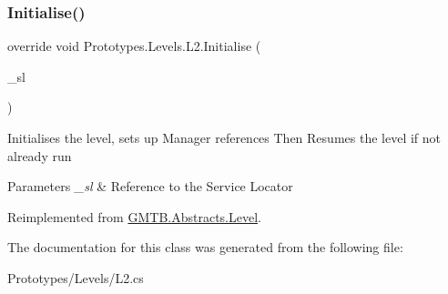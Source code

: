 \subsubsection{\texorpdfstring{Initialise()}{Initialise()}}
{\footnotesize\ttfamily override void Prototypes.\+Levels.\+L2.\+Initialise (\begin{DoxyParamCaption}\item[{\mbox{\hyperlink{interface_g_m_t_b_1_1_interfaces_1_1_i_service_locator}{I\+Service\+Locator}}}]{\+\_\+sl }\end{DoxyParamCaption})\hspace{0.3cm}{\ttfamily [virtual]}}



Initialises the level, sets up Manager references Then Resumes the level if not already run 


\begin{DoxyParams}{Parameters}
{\em \+\_\+sl} & Reference to the Service Locator \\
\hline
\end{DoxyParams}


Reimplemented from \mbox{\hyperlink{class_g_m_t_b_1_1_abstracts_1_1_level_a0048401bb0fb66b0fb0c19b3b25e4265}{G\+M\+T\+B.\+Abstracts.\+Level}}.



The documentation for this class was generated from the following file\+:\begin{DoxyCompactItemize}
\item 
Prototypes/\+Levels/L2.\+cs\end{DoxyCompactItemize}
